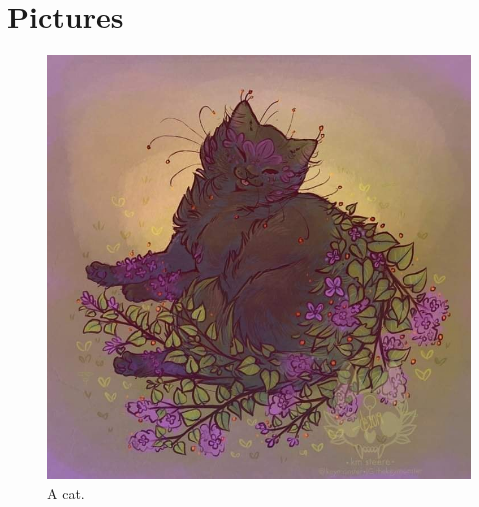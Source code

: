 \documentclass{article}
\begin{document}
\section{Pictures}

\begin{figure}[h!] %
  \includegraphics[width=\linewidth]{cat.jpg}
  \caption{A cat.}
  \label{fig:cat}
\end{figure}
\end{document}
